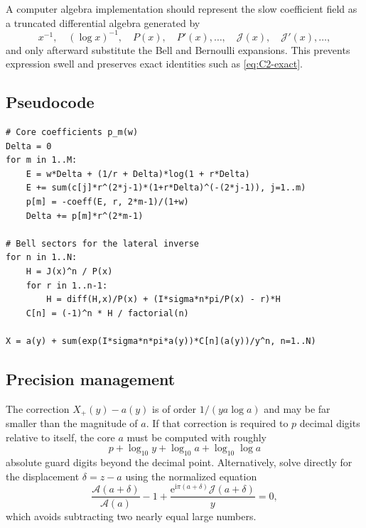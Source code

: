 \documentclass[11pt,a4paper]{article}
\numberwithin{equation}{section}
\theoremstyle{definition}
\theoremstyle{remark}
\newcommand{\e}{\mathrm e}
\newcommand{\ii}{\mathrm i}
\newcommand{\Core}{\mathcal A}
\newcommand{\Tail}{\mathcal J}
\begin{document}
A computer algebra implementation should represent the slow coefficient
field as a truncated differential algebra generated by
\begin{equation}\label{eq:slow-generators}
 x^{-1},\quad (\log x)^{-1},\quad P(x),\quad P'(x),\ldots,
 \quad \Tail(x),\quad\Tail'(x),\ldots,
\end{equation}
and only afterward substitute the Bell and Bernoulli expansions.  This
prevents expression swell and preserves exact identities such as
\eqref{eq:C2-exact}.

\subsection{Pseudocode}

\begin{lstlisting}
# Core coefficients p_m(w)
Delta = 0
for m in 1..M:
    E = w*Delta + (1/r + Delta)*log(1 + r*Delta)
    E += sum(c[j]*r^(2*j-1)*(1+r*Delta)^(-(2*j-1)), j=1..m)
    p[m] = -coeff(E, r, 2*m-1)/(1+w)
    Delta += p[m]*r^(2*m-1)

# Bell sectors for the lateral inverse
for n in 1..N:
    H = J(x)^n / P(x)
    for r in 1..n-1:
        H = diff(H,x)/P(x) + (I*sigma*n*pi/P(x) - r)*H
    C[n] = (-1)^n * H / factorial(n)

X = a(y) + sum(exp(I*sigma*n*pi*a(y))*C[n](a(y))/y^n, n=1..N)
\end{lstlisting}

\subsection{Precision management}

The correction $X_+(y)-a(y)$ is of order $1/(ya\log a)$ and may be far
smaller than the magnitude of $a$.  If that correction is required to $p$
decimal digits relative to itself, the core $a$ must be computed with
roughly
\begin{equation}\label{eq:guard-digits}
 p+\log_{10}y+\log_{10}a+\log_{10}\log a
\end{equation}
absolute guard digits beyond the decimal point.  Alternatively, solve
directly for the displacement $\delta=z-a$ using the normalized equation
\begin{equation}\label{eq:normalized-delta}
 \frac{\Core(a+\delta)}{\Core(a)}-1
 +\frac{\e^{\ii\pi(a+\delta)}\Tail(a+\delta)}{y}=0,
\end{equation}
which avoids subtracting two nearly equal large numbers.
\end{document}
